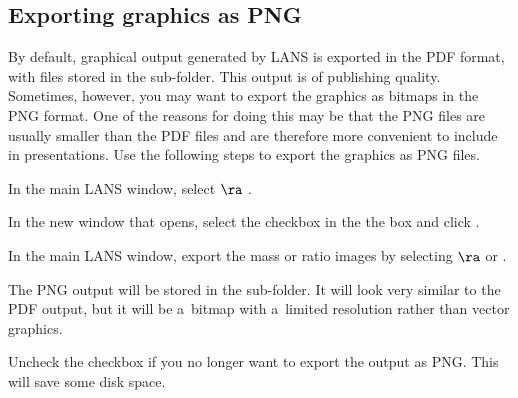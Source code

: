 \subsection{Exporting graphics as PNG}
\setcounter{step}{0}

\goldbox{}
By default, graphical output generated by LANS is exported in the PDF format, with files stored in the  sub-folder. This output is of publishing quality. Sometimes, however, you may want to export the graphics as bitmaps in the PNG format. One of the reasons for doing this may be that the PNG files are usually smaller than the PDF files and are therefore more convenient to include in presentations. Use the following steps to export the graphics as PNG files.
\tcbe

\s In the main LANS window, select  $\ra$ .

\s In the new window that opens, select the  checkbox in the the  box and click .

\s In the main LANS window, export the mass or ratio images by selecting  $\ra$  or . 

\nb\bul The PNG output will be stored in the  sub-folder. It will look very similar to the PDF output, but it will be  a~bitmap with a~limited resolution rather than vector graphics.

\s Uncheck the  checkbox if you no longer want to export the output as PNG. This will save some disk space.
